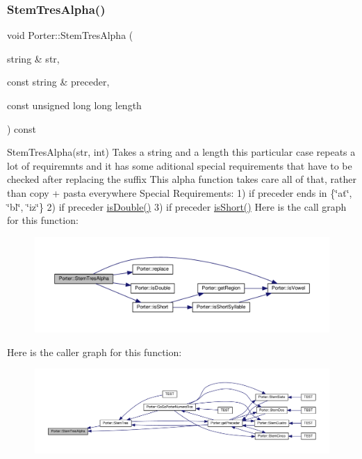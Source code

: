 \mbox{\label{class_porter_ac5e4f3909a27316c6997c92a0019eaaf}} 
\subsubsection{\texorpdfstring{Stem\+Tres\+Alpha()}{StemTresAlpha()}}
{\footnotesize\ttfamily void Porter\+::\+Stem\+Tres\+Alpha (\begin{DoxyParamCaption}\item[{string \&}]{str,  }\item[{const string \&}]{preceder,  }\item[{const unsigned long long}]{length }\end{DoxyParamCaption}) const}

Stem\+Tres\+Alpha(str, int) Takes a string and a length this particular case repeats a lot of requiremnts and it has some aditional special requirements that have to be checked after replacing the suffix This alpha function takes care all of that, rather than copy + pasta everywhere Special Requirements\+: 1) if preceder ends in \{\char`\"{}at\char`\"{}, \char`\"{}bl\char`\"{}, \char`\"{}iz\char`\"{}\} 2) if preceder \hyperlink{class_porter_a7c8a4b3b6103ce655e8ffc8a3eba1897}{is\+Double()} 3) if preceder \hyperlink{class_porter_a35b1cc5606d4e78d1f69ac4037fdde87}{is\+Short()} Here is the call graph for this function\+:
\nopagebreak
\begin{figure}[H]
\begin{center}
\leavevmode
\includegraphics[width=350pt]{class_porter_ac5e4f3909a27316c6997c92a0019eaaf_cgraph}
\end{center}
\end{figure}
Here is the caller graph for this function\+:
\nopagebreak
\begin{figure}[H]
\begin{center}
\leavevmode
\includegraphics[width=350pt]{class_porter_ac5e4f3909a27316c6997c92a0019eaaf_icgraph}
\end{center}
\end{figure}
\mbox{\label{class_porter_ad8b63c9741655393ff9c849d269c953a}} 
